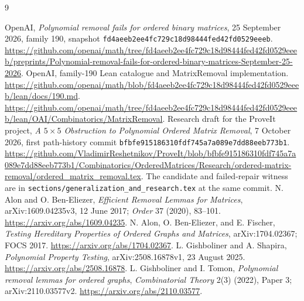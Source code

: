 \documentclass[11pt,a4paper]{article}
\theoremstyle{remark}
\begin{document}
\begin{thebibliography}{9}
\raggedright
{}
OpenAI, \emph{Polynomial removal fails for ordered binary matrices},
25 September 2026, family 190, snapshot
\texttt{fd4aeeb2ee4fc729c18d98444fed42fd0529eeeb}.
\url{https://github.com/openai/math/tree/fd4aeeb2ee4fc729c18d98444fed42fd0529eeeb/preprints/Polynomial-removal-fails-for-ordered-binary-matrices-September-25-2026}.
OpenAI, family-190 Lean catalogue and MatrixRemoval implementation.
\url{https://github.com/openai/math/blob/fd4aeeb2ee4fc729c18d98444fed42fd0529eeeb/lean/docs/190.md}.
\url{https://github.com/openai/math/tree/fd4aeeb2ee4fc729c18d98444fed42fd0529eeeb/lean/OAI/Combinatorics/MatrixRemoval}.
Research draft for the ProveIt project,
\emph{A \(5\times5\) Obstruction to Polynomial Ordered Matrix Removal},
7 October 2026, first path-history commit
\texttt{bfbfe915186310fdf745a7a089e7dd88eeb773b1}.
\url{https://github.com/VladimirReshetnikov/ProveIt/blob/bfbfe915186310fdf745a7a089e7dd88eeb773b1/Combinatorics/OrderedMatrices/Research/ordered-matrix-removal/ordered_matrix_removal.tex}.
The candidate and failed-repair witness are in
\texttt{sections/generalization\_and\_research.tex} at the same commit.
N. Alon and O. Ben-Eliezer,
\emph{Efficient Removal Lemmas for Matrices}, arXiv:1609.04235v3,
12 June 2017; \emph{Order} 37 (2020), 83--101.
\url{https://arxiv.org/abs/1609.04235}.
N. Alon, O. Ben-Eliezer, and E. Fischer,
\emph{Testing Hereditary Properties of Ordered Graphs and Matrices},
arXiv:1704.02367; FOCS 2017.
\url{https://arxiv.org/abs/1704.02367}.
L. Gishboliner and A. Shapira,
\emph{Polynomial Property Testing}, arXiv:2508.16878v1,
23 August 2025.
\url{https://arxiv.org/abs/2508.16878}.
L. Gishboliner and I. Tomon,
\emph{Polynomial removal lemmas for ordered graphs},
\emph{Combinatorial Theory} 2(3) (2022), Paper 3;
arXiv:2110.03577v2.
\url{https://arxiv.org/abs/2110.03577}.
\end{thebibliography}
\end{document}

